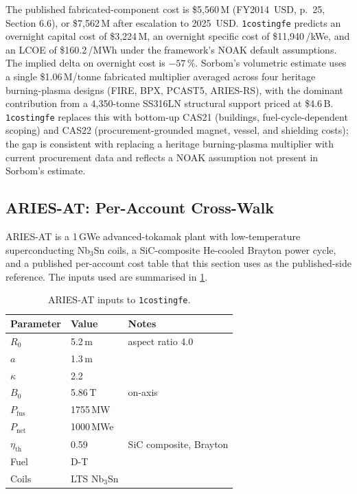 \documentclass{article}
\begin{document}
The published fabricated-component cost is \$5,560\,M (FY2014~USD,
\citep{sorbom2015arc} p.~25, Section 6.6), or \$7,562\,M after
escalation to 2025~USD. \texttt{1costingfe} predicts an overnight
capital cost of \$3,224\,M, an overnight specific cost of
\$11,940\,/kWe, and an LCOE of \$160.2\,/MWh under the framework's
NOAK default assumptions. The implied delta on overnight cost is
$-57$\,\%. Sorbom's volumetric estimate uses a single \$1.06\,M/tonne
fabricated multiplier averaged across four heritage burning-plasma
designs (FIRE, BPX, PCAST5, ARIES-RS), with the dominant contribution
from a 4{,}350-tonne SS316LN structural support priced at \$4.6\,B.
\texttt{1costingfe} replaces this with bottom-up CAS21 (buildings,
fuel-cycle-dependent scoping) and CAS22 (procurement-grounded magnet,
vessel, and shielding costs); the gap is consistent with replacing a
heritage burning-plasma multiplier with current procurement data and
reflects a NOAK assumption not present in Sorbom's estimate.

\subsection{ARIES-AT: Per-Account Cross-Walk}
\label{sec:benchmark-aries}

ARIES-AT \citep{najmabadi2006ariesat} is a 1\,GWe advanced-tokamak
plant with low-temperature superconducting Nb$_3$Sn coils, a
SiC-composite He-cooled Brayton power cycle, and a published
per-account cost table that this section uses as the published-side
reference. The inputs used are summarised in \cref{tab:aries-inputs}.

\begin{table}[h]
\centering
\caption{ARIES-AT inputs to \texttt{1costingfe}.}
\label{tab:aries-inputs}
\begin{tabular}{lll}
\toprule
Parameter & Value & Notes \\
\midrule
$R_0$ & 5.2\,m & aspect ratio 4.0 \\
$a$ & 1.3\,m & \\
$\kappa$ & 2.2 & \\
$B_0$ & 5.86\,T & on-axis \\
$P_\text{fus}$ & 1755\,MW & \\
$P_\text{net}$ & 1000\,MWe & \\
$\eta_\text{th}$ & 0.59 & SiC composite, Brayton \\
Fuel & D-T & \\
Coils & LTS Nb$_3$Sn & \\
\bottomrule
\end{tabular}
\end{table}
\end{document}
